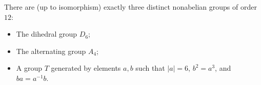 There are (up to isomorphism) exactly three distinct nonabelian groups of order $12$:
\begin{itemize}
\item The dihedral group $D_6$;
\item The alternating group $A_4$;
\item A group $T$ generated by elements $a, b$ such that $|a| = 6$, $b^2 = a^3$, and $ba = a^{-1}b$.
\end{itemize}
